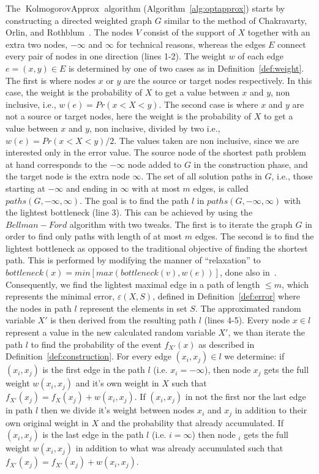 \documentclass{article}
\DeclareMathOperator{\KlmApprox}{KolmogorovApprox}
\begin{document}
The $\KlmApprox$ algorithm (Algorithm~\ref{alg:optapprox}) starts by constructing a directed weighted graph $G$ similar to the method of Chakravarty, Orlin, and Rothblum~\cite{chakravarty1982partitioning}. The nodes $V$ consist of the support of $X$ together with an extra two nodes, $-\infty$ and $\infty$ for technical reasons, whereas the edges $E$ connect every pair of nodes in one direction (lines 1-2). The weight $w$ of each edge $e=(x,y)\in E$ is determined by one of two cases as in Definition~\ref{def:weight}. The first is where nodes $x$ or $y$ are the source or target nodes respectively. In this case, the weight is the probability of $X$ to get a value between $x$ and $y$, non inclusive, i.e., $w(e)=Pr(x<X<y)$. The second case is where $x$ and $y$ are not a source or target nodes, here the weight is the probability of $X$ to get a value between $x$ and $y$, non inclusive, divided by two i.e., $w(e)=Pr(x<X<y)/2$. The values taken are non inclusive, since we are interested only in the error value. 
The source node of the shortest path problem at hand corresponds to the $-\infty$ node added to $G$ in the construction phase, and the target node is the extra node $\infty$.
The set of all solution paths in $G$, i.e., those starting at $-\infty$ and ending in $\infty$ with at most $m$ edges, is called $paths(G, -\infty, \infty)$. The goal is to find the path $l$ in $paths(G, -\infty, \infty)$ with the lightest bottleneck (line 3). This can be achieved by using the $Bellman-Ford$ algorithm with two tweaks. The first is to iterate the graph $G$ in order to find only paths with length of at most $m$ edges. The second is to find the lightest bottleneck as opposed to the traditional objective of finding the shortest path. This is performed by modifying the manner of ``relaxation'' to $bottleneck(x) = min[max(bottleneck(v),w(e))]$, done also in~\cite{shufan2011two}. Consequently, we find the lightest maximal edge in a path of length $\leq m$, which represents the minimal error, $\varepsilon(X,S)$, defined in Definition~\ref{def:error} where the nodes in path $l$ represent the elements in set $S$. The approximated random variable $X'$ is then derived from the resulting path $l$ (lines 4-5). Every node $x\in l$ represent a value in the new calculated random variable $X'$, we than iterate the path $l$ to find the probability of the event $f_{X'}(x)$ as described in Definition~\ref{def:construction}. For every edge $(x_i,x_j)\in l$ we determine: if $(x_i,x_j)$ is the first edge in the path $ l$ (i.e.  $x_i=-\infty$), then node $x_j$ gets the full weight $w(x_i,x_j)$ and it's own weight in $X$ such that $f_{X'}(x_j) = f_{X}(x_j) +  w(x_i,x_j)$. If $(x_i,x_j)$ in not the first nor the last edge in path $l$ then we divide it's weight between nodes $x_i$ and $x_j$ in addition to their own original weight in $X$ and the probability that already accumulated. If $(x_i,x_j)$ is the last edge in the path $ l$ (i.e.  $i=\infty$) then node $_i$ gets the full weight $w(x_i,x_j)$ in addition to what was already accumulated such that $f_{X'}(x_j) = f_{X'}(x_j) +  w(x_i,x_j)$.
\end{document}

